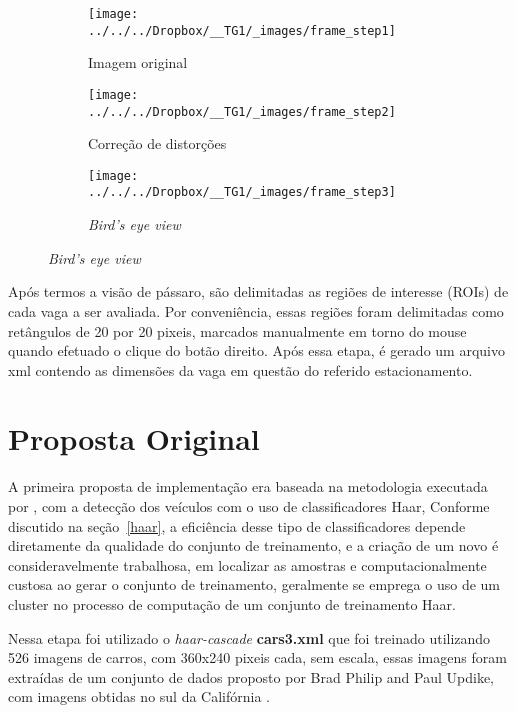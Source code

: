 \documentclass[ecp,tc]{iiufrgs}
\begin{document}
\begin{figure}
	\centering
	\caption{Transformações aplicadas na imagem}
	\begin{subfigure}[b]{0.3\textwidth}
		\texttt{[image: ../../../Dropbox/\_\_TG1/\_images/frame\_step1]}
		\caption{Imagem original}
		\label{fig:frame1}
	\end{subfigure}
	\quad
	\begin{subfigure}[b]{0.3\textwidth}
		\texttt{[image: ../../../Dropbox/\_\_TG1/\_images/frame\_step2]}
		\caption{Correção de distorções}
		\label{fig:frame2}
	\end{subfigure}
	\quad
	\begin{subfigure}[b]{0.3\textwidth}
		\texttt{[image: ../../../Dropbox/\_\_TG1/\_images/frame\_step3]}
		\caption{\textit{Bird's eye view}}
		\label{fig:frame3}
	\end{subfigure}
	\label{fig:frame}
\end{figure}



Após termos a visão de pássaro, são delimitadas as regiões de interesse (ROIs) de cada vaga a ser avaliada. Por conveniência, essas regiões foram delimitadas como retângulos de 20 por 20 pixeis, marcados manualmente em torno do mouse quando efetuado o clique do botão direito. Após essa etapa, é gerado um arquivo xml contendo as dimensões da vaga em questão do referido estacionamento. 

\section{Proposta Original}

A primeira proposta de implementação era baseada na metodologia executada por , com a detecção dos veículos com o uso de classificadores Haar, Conforme discutido na seção~\ref{haar}, a eficiência desse tipo de classificadores depende diretamente da qualidade do conjunto de treinamento, e a criação de um novo é consideravelmente trabalhosa, em localizar as amostras e computacionalmente custosa ao gerar o conjunto de treinamento, geralmente se emprega o uso de um cluster no processo de computação de um conjunto de treinamento Haar.

Nessa etapa foi utilizado o \textit{haar-cascade} \textbf{cars3.xml} que foi treinado utilizando 526 imagens de carros, com 360x240 pixeis cada, sem escala, essas imagens foram extraídas de um conjunto de dados proposto por Brad Philip and Paul Updike, com imagens obtidas no sul da Califórnia \cite{Oliveira2008}.
\end{document}
